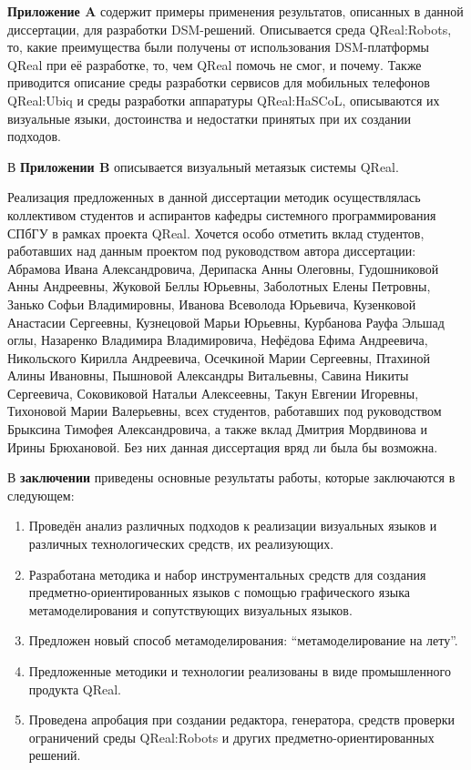 \textbf{Приложение A} содержит примеры применения результатов, описанных в данной 
диссертации, для разработки DSM-решений. Описывается среда QReal:Robots, то, 
какие преимущества были получены от использования DSM-платформы QReal при её 
разработке, то, чем QReal помочь не смог, и почему. Также приводится 
описание среды разработки сервисов для мобильных телефонов QReal:Ubiq и среды
разработки аппаратуры QReal:HaSCoL, описываются их визуальные языки, 
достоинства и недостатки принятых при их создании подходов.

В \textbf{Приложении B} описывается визуальный метаязык системы QReal.

Реализация предложенных в данной диссертации методик осуществлялась коллективом студентов 
и аспирантов кафедры системного программирования СПбГУ в рамках проекта QReal. Хочется 
особо отметить вклад студентов, работавших над данным проектом под руководством автора 
диссертации: Абрамова Ивана Александровича, Дерипаска Анны Олеговны, Гудошниковой Анны Андреевны, 
Жуковой Беллы Юрьевны, Заболотных Елены Петровны, Занько Софьи Владимировны, Иванова Всеволода Юрьевича, 
Кузенковой Анастасии Сергеевны, Кузнецовой Марьи Юрьевны, Курбанова Рауфа Эльшад оглы, 
Назаренко Владимира Владимировича, Нефёдова Ефима Андреевича, Никольского Кирилла Андреевича, 
Осечкиной Марии Сергеевны, Птахиной Алины Ивановны, Пышновой Александры Витальевны, 
Савина Никиты Сергеевича, Соковиковой Натальи Алексеевны, Такун Евгении Игоревны, 
Тихоновой Марии Валерьевны, всех студентов, работавших под руководством Брыксина Тимофея Александровича, 
а также вклад Дмитрия Мордвинова и Ирины Брюхановой. Без них данная диссертация вряд ли 
была бы возможна.

В \textbf{заключении} приведены основные результаты работы, которые заключаются в следующем:
\begin{enumerate}
	\item Проведён анализ различных подходов к реализации визуальных языков и различных 
		технологических средств, их реализующих.
	\item Разработана методика и набор инструментальных средств для  создания предметно-ориентированных 
		языков с помощью графического языка метамоделирования и сопутствующих визуальных языков.
	\item Предложен новый способ метамоделирования: "`метамоделирование на лету"'.
	\item Предложенные методики и технологии реализованы в виде промышленного продукта QReal.
	\item Проведена апробация при создании редактора, генератора, средств проверки ограничений 
		среды QReal:Robots и других предметно-ориентированных решений.
\end{enumerate}

\renewcommand{\refname}{\Large Публикации автора по теме диссертации}
\nocite{*}

